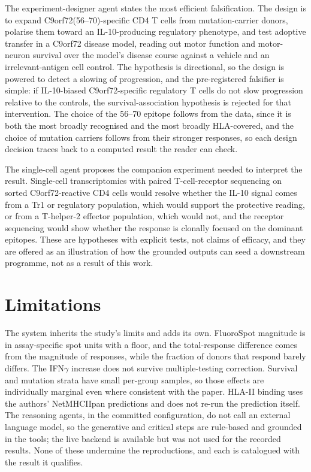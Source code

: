 \documentclass[11pt]{article}
\begin{document}
The experiment-designer agent states the most efficient falsification. The design is to expand
C9orf72(56--70)-specific CD4 T cells from mutation-carrier donors, polarise them toward an
IL-10-producing regulatory phenotype, and test adoptive transfer in a C9orf72 disease model, reading
out motor function and motor-neuron survival over the model's disease course against a vehicle and an
irrelevant-antigen cell control. The hypothesis is directional, so the design is powered to detect a
slowing of progression, and the pre-registered falsifier is simple: if IL-10-biased
C9orf72-specific regulatory T cells do not slow progression relative to the controls, the
survival-association hypothesis is rejected for that intervention. The choice of the 56--70 epitope
follows from the data, since it is both the most broadly recognised and the most broadly HLA-covered,
and the choice of mutation carriers follows from their stronger responses, so each design decision
traces back to a computed result the reader can check.

The single-cell agent proposes the companion experiment needed to interpret the result. Single-cell
transcriptomics with paired T-cell-receptor sequencing on sorted C9orf72-reactive CD4 cells would
resolve whether the IL-10 signal comes from a Tr1 or regulatory population, which would support the
protective reading, or from a T-helper-2 effector population, which would not, and the receptor
sequencing would show whether the response is clonally focused on the dominant epitopes. These are
hypotheses with explicit tests, not claims of efficacy, and they are offered as an illustration of
how the grounded outputs can seed a downstream programme, not as a result of this work.

\section{Limitations}
The system inherits the study's limits and adds its own. FluoroSpot magnitude is in assay-specific
spot units with a floor, and the total-response difference comes from the magnitude of responses,
while the fraction of donors that respond barely differs. The IFN$\gamma$ increase does not survive multiple-testing
correction. Survival and mutation strata have small per-group samples, so those effects are
individually marginal even where consistent with the paper. HLA-II binding uses the authors'
NetMHCIIpan predictions and does not re-run the prediction itself. The reasoning agents, in the committed
configuration, do not call an external language model, so the generative and critical steps are
rule-based and grounded in the tools; the live backend is available but was not used for the
recorded results. None of these undermine the reproductions, and each is catalogued with the result
it qualifies.
\end{document}
